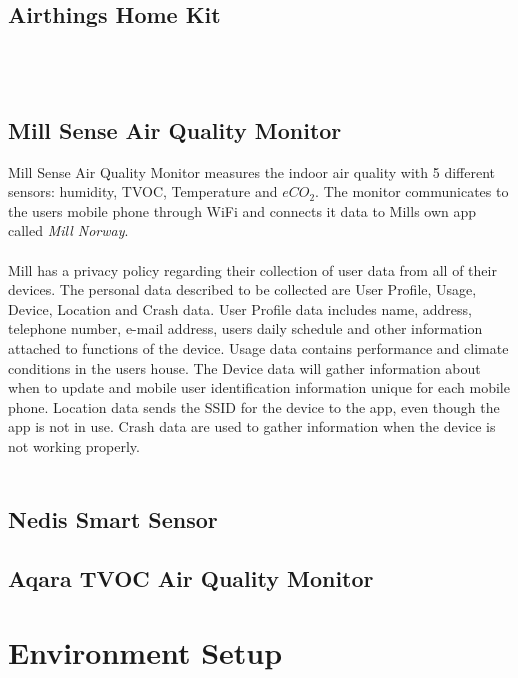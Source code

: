 \subsection*{Airthings Home Kit}

\\\\
\subsection*{Mill Sense Air Quality Monitor}
Mill Sense Air Quality Monitor measures the indoor air quality with 5 different sensors: humidity, TVOC, Temperature and \(eCO_2\). \cite{Mill} The monitor communicates to the users mobile phone through WiFi and connects it data to Mills own app called \textit{Mill Norway}. 
\\\\
Mill has a privacy policy regarding their collection of user data from all of their devices. \cite{MillPrivacy} The personal data described to be collected are User Profile, Usage, Device, Location and Crash data. User Profile data includes name, address, telephone number, e-mail address, users daily schedule and other information attached to functions of the device. Usage data contains performance and climate conditions in the users house. The Device data will gather information about when to update and mobile user identification information unique for each mobile phone. Location data sends the SSID for the device to the app, even though the app is not in use. Crash data are used to gather information when the device is not working properly. \cite{MillPrivacy} 
\\\\
\subsection*{Nedis Smart Sensor}

\subsection*{Aqara TVOC Air Quality Monitor}

\section*{Environment Setup}

